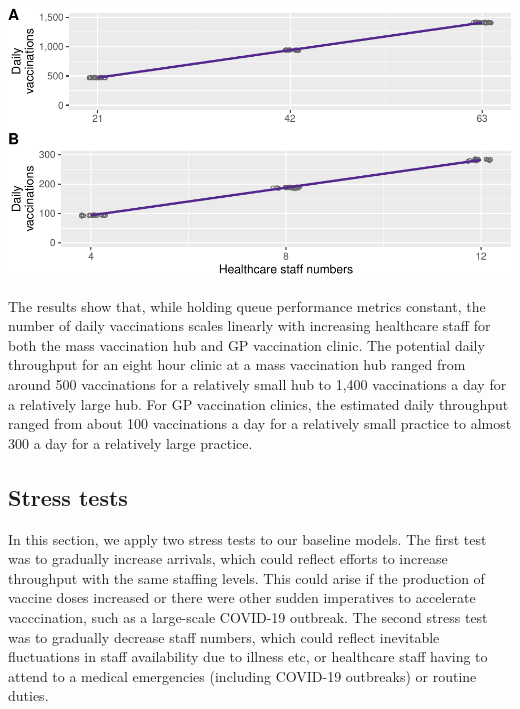 \documentclass{article}
\let\origfigure\figure
\let\endorigfigure\endfigure
\renewenvironment{figure}[1][2] {
    \expandafter\origfigure\expandafter[H]
} {
    \endorigfigure
}
\begin{document}
\begin{figure}

{\centering \includegraphics{Preprint_files/figure-latex/baselineThroughput-1} 

}

\caption{Baseline daily throughput for mass vaccination hubs (A) and GP vaccination clinics (B)}\label{fig:baselineThroughput}
\end{figure}

The results show that, while holding queue performance metrics constant,
the number of daily vaccinations scales linearly with increasing
healthcare staff for both the mass vaccination hub and GP vaccination
clinic. The potential daily throughput for an eight hour clinic at a
mass vaccination hub ranged from around 500 vaccinations for a
relatively small hub to 1,400 vaccinations a day for a relatively large
hub. For GP vaccination clinics, the estimated daily throughput ranged
from about 100 vaccinations a day for a relatively small practice to
almost 300 a day for a relatively large practice.

\hypertarget{stress-tests}{%
\subsection{Stress tests}\label{stress-tests}}

In this section, we apply two stress tests to our baseline models. The
first test was to gradually increase arrivals, which could reflect
efforts to increase throughput with the same staffing levels. This could
arise if the production of vaccine doses increased or there were other
sudden imperatives to accelerate vacccination, such as a large-scale
COVID-19 outbreak. The second stress test was to gradually decrease
staff numbers, which could reflect inevitable fluctuations in staff
availability due to illness etc, or healthcare staff having to attend to
a medical emergencies (including COVID-19 outbreaks) or routine duties.
\end{document}

